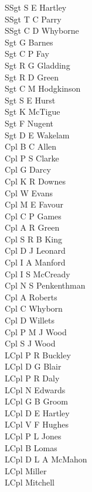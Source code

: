 \begin{multicols}{4}
  \scriptsize
  \noindent
  SSgt S E Hartley \\
  SSgt T C Parry \\
  SSgt C D Whyborne \\
  Sgt G Barnes \\
  Sgt C P Fay \\
  Sgt R G Gladding \\
  Sgt R D Green \\
  Sgt C M Hodgkinson \\
  Sgt S E Hurst \\
  Sgt K McTigue \\
  Sgt F Nugent \\
  Sgt D E Wakelam \\
  Cpl B C Allen \\
  Cpl P S Clarke \\
  Cpl G Darcy \\
  Cpl K R Downes \\
  Cpl W Evans \\
  Cpl M E Favour \\
  Cpl C P Games \\
  Cpl A R Green \\
  Cpl S R B King \\
  Cpl D J Leonard \\
  Cpl I A Manford \\
  Cpl I S McCready \\
  Cpl N S Penkenthman \\
  Cpl A Roberts \\
  Cpl C Whyborn \\
  Cpl D Willets \\
  Cpl P M J Wood \\
  Cpl S J Wood \\
  LCpl P R Buckley \\
  LCpl D G Blair \\
  LCpl P R Daly \\
  LCpl N Edwards \\
  LCpl G B Groom \\
  LCpl D E Hartley \\
  LCpl V F Hughes \\
  LCpl P L Jones \\
  LCpl B Lomas \\
  LCpl D L A McMahon \\
  LCpl Miller \\
  LCpl Mitchell \\

\end{multicols}
